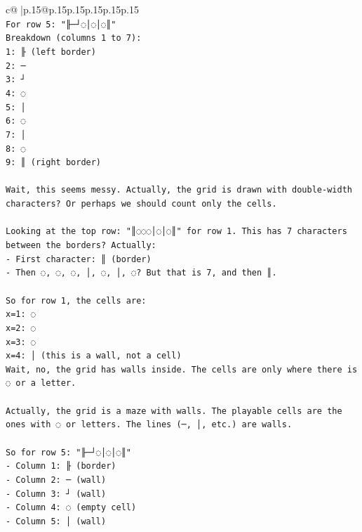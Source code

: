 \documentclass{article}
\begin{document}
{\begin{supertabular}{c@{$\;$}|p{.15\linewidth}@{}p{.15\linewidth}p{.15\linewidth}p{.15\linewidth}p{.15\linewidth}p{.15\linewidth}}
{{{\\ 
\texttt{For row 5: "╟─┘◌│◌│◌║" } \\
\texttt{Breakdown (columns 1 to 7):} \\
\texttt{1: ╟ (left border)} \\
\texttt{2: ─} \\
\texttt{3: ┘} \\
\texttt{4: ◌} \\
\texttt{5: │} \\
\texttt{6: ◌} \\
\texttt{7: │} \\
\texttt{8: ◌} \\
\texttt{9: ║ (right border)} \\
\\ 
\texttt{Wait, this seems messy. Actually, the grid is drawn with double{-}width characters? Or perhaps we should count only the cells.} \\
\\ 
\texttt{Looking at the top row: "║◌◌◌│◌│◌║" for row 1. This has 7 characters between the borders? Actually:} \\
\texttt{{-} First character: ║ (border)} \\
\texttt{{-} Then ◌, ◌, ◌, │, ◌, │, ◌? But that is 7, and then ║.} \\
\\ 
\texttt{So for row 1, the cells are:} \\
\texttt{x=1: ◌} \\
\texttt{x=2: ◌} \\
\texttt{x=3: ◌} \\
\texttt{x=4: │ (this is a wall, not a cell)} \\
\texttt{Wait, no, the grid has walls inside. The cells are only where there is ◌ or a letter.} \\
\\ 
\texttt{Actually, the grid is a maze with walls. The playable cells are the ones with ◌ or letters. The lines (─, │, etc.) are walls.} \\
\\ 
\texttt{So for row 5: "╟─┘◌│◌│◌║"} \\
\texttt{{-} Column 1: ╟ (border)} \\
\texttt{{-} Column 2: ─ (wall)} \\
\texttt{{-} Column 3: ┘ (wall)} \\
\texttt{{-} Column 4: ◌ (empty cell)} \\
\texttt{{-} Column 5: │ (wall)} \\
}}}
\end{supertabular}}
\end{document}
